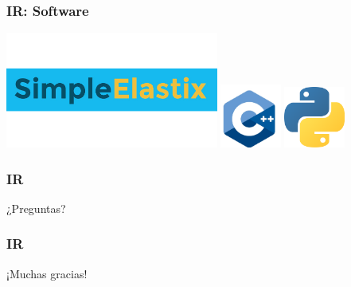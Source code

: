 \documentclass{beamer} %
\begin{document}
\begin{frame}
\frametitle{IR: Software}

\hfil\hfil\includegraphics[width=7cm]{images/logos/SimpleElastix.png}\newline
  \null\hfil\hfil\makebox[5cm]{}\newline
  \pause
  \vfil
  \hfil\hfil\includegraphics[width=2cm]{images/logos/c.jpg}\hfil\hfil
    \includegraphics[width=2cm]{images/logos/python.png}\newline
  \null\hfil\hfil\makebox[5cm]{}
    \hfil\hfil\makebox[5cm]{}

\end{frame}

\begin{frame}
\frametitle{IR}

\begin{block}{}
\centering
\Huge ¿Preguntas?
\end{block}

\end{frame}

\begin{frame}
\frametitle{IR}

\begin{block}{}
\centering
\Huge ¡Muchas gracias!
\end{block}

\end{frame}
\end{document}
